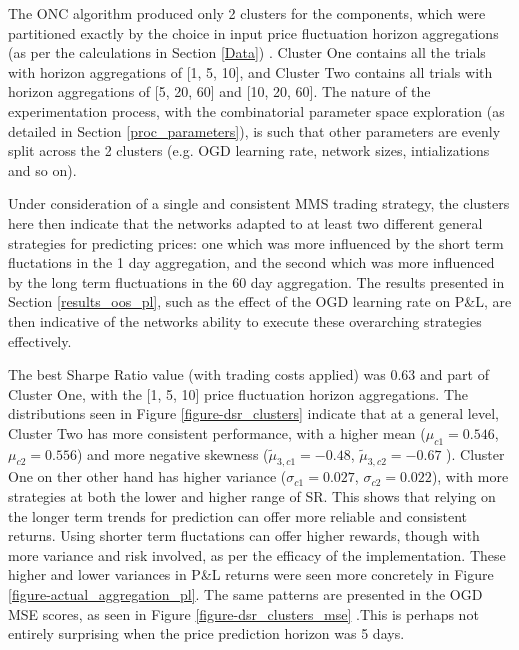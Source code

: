 \documentclass[a4paper,11pt,oneside]{article}
\theoremstyle{plain}
\theoremstyle{definition}
\begin{document}
	The ONC algorithm produced only 2 clusters for the components, which were partitioned exactly by the choice in input price fluctuation horizon aggregations (as per the calculations in Section \ref{Data}) . Cluster One contains all the trials with horizon aggregations of [1, 5, 10], and Cluster Two contains all trials with horizon aggregations of [5, 20, 60] and [10, 20, 60]. The nature of the experimentation process, with the combinatorial parameter space exploration (as detailed in Section \ref{proc_parameters}), is such that other parameters are evenly split across the 2 clusters (e.g. OGD learning rate, network sizes, intializations and so on).\newline
	
	Under consideration of a single and consistent MMS trading strategy, the clusters here then indicate that the networks adapted to at least two different general strategies for predicting prices: one which was more influenced by the short term fluctations in the 1 day aggregation, and the second which was more influenced by the long term fluctuations in the 60 day aggregation. The results presented in Section \ref{results_oos_pl}, such as the effect of the OGD learning rate on P\&L, are then indicative of the networks ability to execute these overarching strategies effectively. \newline
	
	The best Sharpe Ratio value (with trading costs applied) was 0.63 and part of Cluster One, with the [1, 5, 10] price fluctuation horizon aggregations. The distributions seen in Figure \ref{figure-dsr_clusters} indicate that at a general level, Cluster Two has more consistent performance, with a higher mean ($\mu_{c1} = 0.546$, $\mu_{c2} = 0.556$) and more negative skewness ($\tilde{\mu}_{3,c1} = -0.48$, $\tilde{\mu}_{3,c2} = -0.67$ ). Cluster One on ther other hand has higher variance ($\sigma_{c1} = 0.027$, $\sigma_{c2} = 0.022$), with more strategies at both the lower and higher range of SR. This shows that relying on the longer term trends for prediction can offer more reliable and consistent returns. Using shorter term fluctations can offer higher rewards, though with more variance and risk involved, as per the efficacy of the implementation. These higher and lower variances in P\&L returns were seen more concretely in Figure \ref{figure-actual_aggregation_pl}. The same patterns are presented in the OGD MSE scores, as seen in Figure \ref{figure-dsr_clusters_mse} .This is perhaps not entirely surprising when the price prediction horizon was 5 days.\newline
\end{document}
